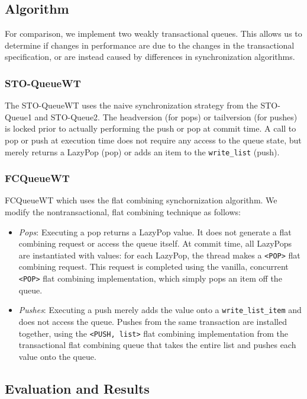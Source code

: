 \subsection{Algorithm}

For comparison, we implement two weakly transactional queues. This allows us to determine if changes in performance are due to the changes in the transactional specification, or are instead caused by differences in synchronization algorithms.

\subsubsection{STO-QueueWT}
The STO-QueueWT uses the naive synchronization strategy from the STO-Queue1 and STO-Queue2. The headversion (for pops) or tailversion (for pushes) is locked prior to actually performing the push or pop at commit time. A call to pop or push at execution time does not require any access to the queue state, but merely returns a LazyPop (pop) or adds an item to the \texttt{write\_list} (push).

\subsubsection{FCQueueWT}
FCQueueWT which uses the flat combining synchornization algorithm. We modify the nontransactional, flat combining technique as follows:
\begin{itemize}
    \item \emph{Pops}: 
    Executing a pop returns a LazyPop value. It does not generate a flat combining request or access the queue itself. At commit time, all LazyPops are instantiated with values: for each LazyPop, the thread makes a \texttt{<POP>} flat combining request. This request is completed using the vanilla, concurrent \texttt{<POP>} flat combining implementation, which simply pops an item off the queue.

    \item \emph{Pushes}: 
    Executing a push merely adds the value onto a \texttt{write\_list\_item} and does not access the queue. Pushes from the same transaction are installed together, using the \texttt{<PUSH, list>} flat combining implementation from the transactional flat combining queue that takes the entire list and pushes each value onto the queue.
\end{itemize}

\subsection{Evaluation and Results}

